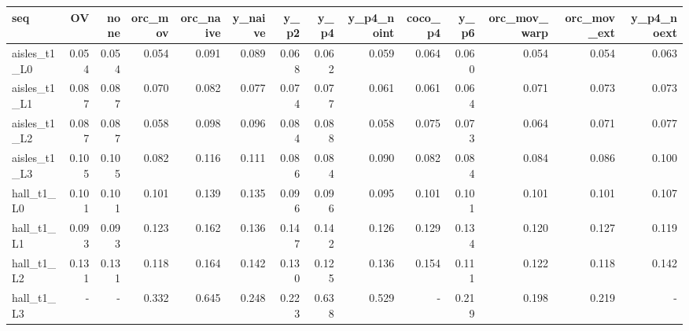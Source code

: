 \begin{tabular}{lrrrrrrrrrrrrr}
\toprule
seq & OV & none & orc\_mov & orc\_naive & y\_naive & y\_p2 & y\_p4 & y\_p4\_noint & coco\_p4 & y\_p6 & orc\_mov\_warp & orc\_mov\_ext & y\_p4\_noext \\
\midrule
aisles\_t1\_L0 & 0.054 & 0.054 & 0.054 & 0.091 & 0.089 & 0.068 & 0.062 & 0.059 & 0.064 & 0.060 & 0.054 & 0.054 & 0.063 \\
aisles\_t1\_L1 & 0.087 & 0.087 & 0.070 & 0.082 & 0.077 & 0.074 & 0.077 & 0.061 & 0.061 & 0.064 & 0.071 & 0.073 & 0.073 \\
aisles\_t1\_L2 & 0.087 & 0.087 & 0.058 & 0.098 & 0.096 & 0.084 & 0.088 & 0.058 & 0.075 & 0.073 & 0.064 & 0.071 & 0.077 \\
aisles\_t1\_L3 & 0.105 & 0.105 & 0.082 & 0.116 & 0.111 & 0.086 & 0.084 & 0.090 & 0.082 & 0.084 & 0.084 & 0.086 & 0.100 \\
hall\_t1\_L0 & 0.101 & 0.101 & 0.101 & 0.139 & 0.135 & 0.096 & 0.096 & 0.095 & 0.101 & 0.101 & 0.101 & 0.101 & 0.107 \\
hall\_t1\_L1 & 0.093 & 0.093 & 0.123 & 0.162 & 0.136 & 0.147 & 0.142 & 0.126 & 0.129 & 0.134 & 0.120 & 0.127 & 0.119 \\
hall\_t1\_L2 & 0.131 & 0.131 & 0.118 & 0.164 & 0.142 & 0.130 & 0.125 & 0.136 & 0.154 & 0.111 & 0.122 & 0.118 & 0.142 \\
hall\_t1\_L3 & - & - & 0.332 & 0.645 & 0.248 & 0.223 & 0.638 & 0.529 & - & 0.219 & 0.198 & 0.219 & - \\
\bottomrule
\end{tabular}
